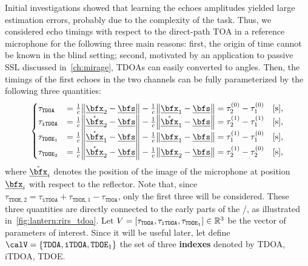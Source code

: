 \newcommand{\setTDOA}{\ensuremath{\set{\mathtt{TDOA}, \mathtt{iTDOA}, {\mathtt{TDOE}_1}}}}
\mynewline
Initial investigations showed that learning the echoes amplitudes yielded large estimation errors, probably due to the complexity of the task.
Thus, we considered echo timings with respect to the direct-path \ac{TOA} in a reference microphone for the following three main reasons:
first, the origin of time cannot be known in the blind setting;
second, motivated by an application to passive \ac{SSL} discussed in~\cref{ch:mirage}, \acfp{TDOA} can easily converted to angles.
Then, the timings of the first echoes in the two channels can be fully parameterized by the following three quantities:
\begin{equation}
    \begin{cases}
        \tau_\mathtt{TDOA}  &= \tfrac{1}{c} \norm{\positionMicrophone_2 - \positionSource} - \tfrac{1}{c} \norm{\positionMicrophone_1 - \positionSource} = \tau_2^{(0)} - \tau_1^{(0)} \quad[\text{s}],\\
        \tau_\mathtt{iTDOA} &= \tfrac{1}{c} \norm{\mathring{\positionMicrophone}_2 - \positionSource} - \tfrac{1}{c} \norm{\mathring{\positionMicrophone}_1 - \positionSource} = \tau_2^{(1)} - \tau_1^{(1)} \quad[\text{s}],\\
        \tau_{\mathtt{TDOE}_1}  &= \tfrac{1}{c} \norm{\mathring{\positionMicrophone}_1 - \positionSource} - \tfrac{1}{c} \norm{\positionMicrophone_1 - \positionSource} = \tau_1^{(1)} - \tau_1^{(0)} \quad[\text{s}],\\
        \tau_{\mathtt{TDOE}_2}  &= \tfrac{1}{c} \norm{\mathring{\positionMicrophone}_2 - \positionSource} - \tfrac{1}{c} \norm{\positionMicrophone_2 - \positionSource} = \tau_2^{(1)} - \tau_2^{(0)} \quad[\text{s}],
    \end{cases}
\end{equation}
where $\mathring{\positionMicrophone}_i$ denotes the position of the image of the microphone at position $\positionMicrophone_i$ with respect to the reflector.
Note that, since $\tau_{\mathtt{TDOE},2} = \tau_\mathtt{iTDOA} + \tau_{\mathtt{TDOE}, 1} - \tau_\mathtt{TDOA}$, only the first three will be considered.
These three quantities are directly connected to the early parts of the \RIRs/, as illustrated in~\cref{fig:lantern:rirs_tdoa}. Let $V = \klist{\tau_{\mathtt{TDOA}}, \tau_{\mathtt{iTDOA}}, \tau_{\mathtt{TDOE}_1}}\in\mathbb{R}^3$ be the vector of parameters of interest.
Since it will be useful later, let define $\calV = \setTDOA$ the set of three \textbf{indexes} denoted by \ac{TDOA}, \ac{iTDOA}, \ac{TDOE}.

